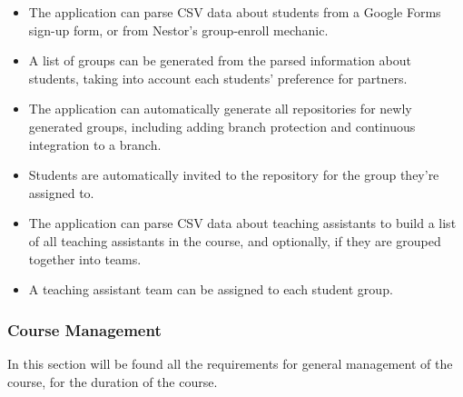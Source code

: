 \documentclass{article}
\begin{document}
			\begin{itemize}
				\item The application can parse CSV data about students from a Google Forms sign-up form, or from Nestor's group-enroll mechanic.
				
				\item A list of groups can be generated from the parsed information about students, taking into account each students' preference for partners.
				
				\item The application can automatically generate all repositories for newly generated groups, including adding branch protection and continuous integration to a branch.
				
				\item Students are automatically invited to the repository for the group they're assigned to.
				
				\item The application can parse CSV data about teaching assistants to build a list of all teaching assistants in the course, and optionally, if they are grouped together into teams.
				
				\item A teaching assistant team can be assigned to each student group.
			\end{itemize}
			
		\subsubsection{Course Management}
			In this section will be found all the requirements for general management of the course, for the duration of the course.
			
\end{document}
